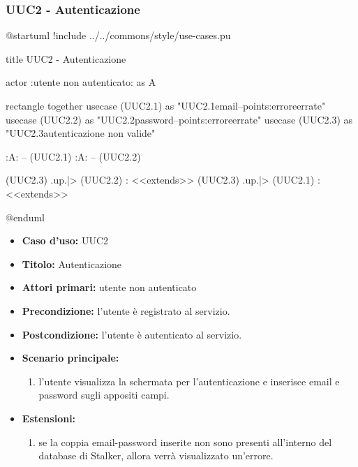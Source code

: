 \documentclass[casi-duso]{subfiles}
\begin{document}
\subsubsection{UUC2 - Autenticazione}%
\label{subsub:UUC2utente}

\begin{plantuml}
@startuml
!include ../../commons/style/use-cases.pu
  
title UUC2 - Autenticazione
  
actor :utente non autenticato: as A
  
rectangle {
  together {
    usecase (UUC2.1) as "UUC2.1\nInserimento email\n--\nExtension points:\nVisualizzazione errore\ncredenziali errate"
    usecase (UUC2.2) as "UUC2.2\nInserimento password\n--\nExtension points:\nVisualizzazione errore\ncredenziali errate" 
    usecase (UUC2.3) as "UUC2.3\nInformazioni autenticazione non valide"     
  }
}
  
:A: -- (UUC2.1)
:A: -- (UUC2.2)
  
(UUC2.3) .up.|> (UUC2.2) : <<extends>>
(UUC2.3) .up.|> (UUC2.1) : <<extends>>
  
@enduml
\end{plantuml}

\begin{itemize}
  \item \textbf{Caso d’uso:} UUC2
  \item \textbf{Titolo:} Autenticazione
  \item \textbf{Attori primari:} utente non autenticato
  \item \textbf{Precondizione:} l'utente è registrato al servizio.
  \item \textbf{Postcondizione:} l'utente è autenticato al servizio.
  \item \textbf{Scenario principale:}
        \begin{enumerate}
          \item l'utente visualizza la schermata per l'autenticazione e inserisce email e password sugli appositi campi.
        \end{enumerate}
  \item \textbf{Estensioni:}
        \begin{enumerate}
          \item se la coppia email-password inserite non sono presenti all'interno del database di Stalker, allora verrà visualizzato un'errore.
        \end{enumerate}
\end{itemize}
\end{document}
